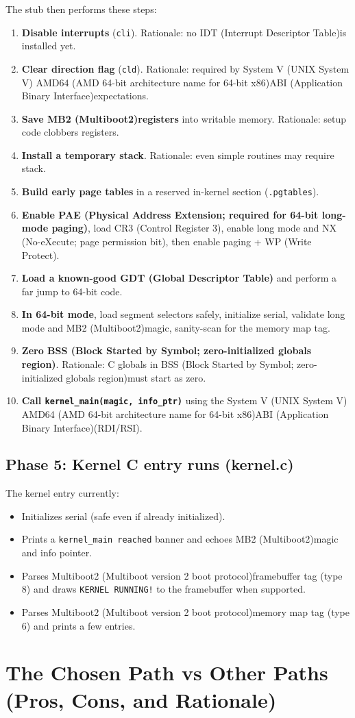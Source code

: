 \documentclass[11pt]{article}
\newcommand{\AMDsixtyfour}{AMD64 (AMD 64-bit architecture name for 64-bit x86)}
\newcommand{\BSS}{BSS (Block Started by Symbol; zero-initialized globals region)}
\newcommand{\CRthree}{CR3 (Control Register 3)}
\newcommand{\GDT}{GDT (Global Descriptor Table)}
\newcommand{\IDT}{IDT (Interrupt Descriptor Table)}
\newcommand{\MBtwo}{Multiboot2 (Multiboot version 2 boot protocol)}
\newcommand{\MBtwoShort}{MB2 (Multiboot2)}
\newcommand{\NX}{NX (No-eXecute; page permission bit)}
\newcommand{\PAE}{PAE (Physical Address Extension; required for 64-bit long-mode paging)}
\newcommand{\SysV}{System V (UNIX System V) \AMDsixtyfour ABI (Application Binary Interface)}
\newcommand{\WP}{WP (Write Protect)}
\begin{document}
The stub then performs these steps:
\begin{enumerate}
  \item \textbf{Disable interrupts} (\texttt{cli}). Rationale: no \IDT is installed yet.
  \item \textbf{Clear direction flag} (\texttt{cld}). Rationale: required by \SysV expectations.
  \item \textbf{Save \MBtwoShort registers} into writable memory. Rationale: setup code clobbers registers.
  \item \textbf{Install a temporary stack}. Rationale: even simple routines may require stack.
  \item \textbf{Build early page tables} in a reserved in-kernel section (\texttt{.pgtables}).
  \item \textbf{Enable \PAE}, load \CRthree, enable long mode and \NX, then enable paging + \WP.
  \item \textbf{Load a known-good \GDT} and perform a far jump to 64-bit code.
  \item \textbf{In 64-bit mode}, load segment selectors safely, initialize serial, validate long mode and \MBtwoShort magic, sanity-scan for the memory map tag.
  \item \textbf{Zero \BSS}. Rationale: C globals in \BSS must start as zero.
  \item \textbf{Call \texttt{kernel\_main(magic, info\_ptr)}} using the \SysV (RDI/RSI).
\end{enumerate}

\subsection{Phase 5: Kernel C entry runs (kernel.c)}
The kernel entry currently:
\begin{itemize}
  \item Initializes serial (safe even if already initialized).
  \item Prints a \texttt{kernel\_main reached} banner and echoes \MBtwoShort magic and info pointer.
  \item Parses \MBtwo framebuffer tag (type 8) and draws \texttt{KERNEL RUNNING!} to the framebuffer when supported.
  \item Parses \MBtwo memory map tag (type 6) and prints a few entries.
\end{itemize}

\newpage
\section{The Chosen Path vs Other Paths (Pros, Cons, and Rationale)}
\end{document}
